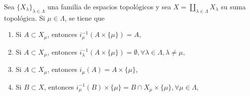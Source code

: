 

\begin{proposition}
Sea $\{ X_{\lambda} \}_{\lambda \in \Lambda}$ una familia de espacios topológicos y sea $X = \coprod_{\lambda \in \Lambda} X_{\lambda}$ su suma topológica. Si $\mu \in \Lambda$, se tiene que
\begin{enumerate}[label=\textnormal{(\roman*)}, align=left, labelwidth=1.7em, leftmargin=3.0em]
\item Si $A \subset X_{\mu}$, entonces $i^{-1}_{\mu}(A \times \{ \mu \}) = A$,
\item Si $A \subset X_{\mu}$, entonces $i^{-1}_{\lambda}(A \times \{ \mu \}) = \emptyset, \forall \lambda \in \Lambda, \lambda \ne \mu$,
\item Si $A \subset X_{\mu}$, entonces $i_{\mu}(A) = A \times \{ \mu \}$,
\item Si $B \subset X$, entonces $i^{-1}_{\mu}(B) \times \{ \mu \} = B \cap X_{\mu} \times \{ \mu \}, \forall \mu \in \Lambda$,
\end{enumerate}
\end{proposition}

